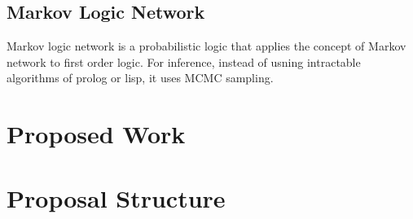 \subsection{Markov Logic Network}
Markov logic network is a probabilistic logic that applies the concept of Markov network to first order logic. For inference, instead of usning intractable algorithms of prolog or lisp, it uses MCMC sampling.

\section{Proposed Work}

\section{Proposal Structure}

 
 
 
 
 
